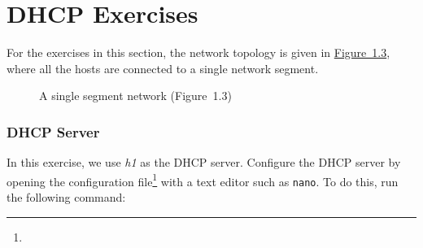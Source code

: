 \documentclass{UTNetLab}
\begin{document}
\part{DHCP Exercises}
    For the exercises in this section, the network topology is given in \hyperref[fig:1.3]{Figure~1.3}, where all the hosts are connected to a single network segment.

    \begin{center}
        \begin{minipage}{0.48\textwidth}
            \begin{flushright}
                \begin{figure}[H]
                    \centering
                    \caption{A single segment network (Figure~1.3)}
                    \label{fig:1.3}   
                \end{figure}
            \end{flushright}
        \end{minipage}
    \end{center}

\section{DHCP Server}
    In this exercise, we use \textit{h1} as the DHCP server. Configure the DHCP server by opening the configuration file\footnote{} with a text editor such as \lstinline{nano}. To do this, run the following command:
    
\end{document}
